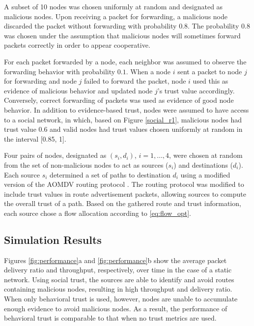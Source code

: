 \documentclass[conference]{IEEEtran}
\begin{document}
 A subset of 10 nodes was chosen uniformly at random and designated as malicious nodes.  Upon receiving a packet for forwarding, a malicious node discarded the packet without forwarding with probability $0.8$. The probability $0.8$ was chosen under the assumption that malicious nodes will sometimes forward packets correctly in order to appear cooperative.

 For each packet forwarded by a node, each neighbor was assumed to observe the forwarding behavior with probability $0.1$.  When a node $i$ sent a packet to node $j$ for forwarding and node $j$ failed to forward the packet, node $i$ used this as evidence of malicious behavior and updated node $j$'s trust value accordingly.  Conversely, correct forwarding of packets was used as evidence of good node behavior. In addition to evidence-based trust, nodes were assumed to have access to a social network, in which, based on Figure \ref{social_r1}, malicious nodes had trust value 0.6 and valid nodes had trust values chosen uniformly at random in the interval [0.85, 1]. 






Four pairs of nodes, designated as $(s_{i}, d_{i})$, $i=1,\ldots, 4$, were chosen at random from the set of non-malicious nodes to act as sources ($s_{i}$) and destinations ($d_{i}$). Each source $s_{i}$ determined a set of paths to destination $d_{i}$ using a modified version of the AOMDV routing protocol \cite{marina2002ad}.  The routing protocol was modified to include trust values in route advertisement packets, allowing sources to compute the overall trust of a path.  Based on the gathered route and trust information, each source chose a flow allocation according to \eqref{eq:flow_opt}. 

 \subsection{Simulation Results}
 \label{subsec:results}


Figures \ref{fig:performance}a and \ref{fig:performance}b show the average packet delivery ratio and throughput, respectively, over time in the case of a static network.
Using social trust, the sources are able to identify and avoid routes containing malicious nodes, resulting in high throughput and delivery ratio.
When only behavioral trust is used, however, nodes are unable to accumulate enough evidence to avoid malicious nodes.
As a result, the performance of behavioral trust is comparable to that when no trust metrics are used.
\end{document}
